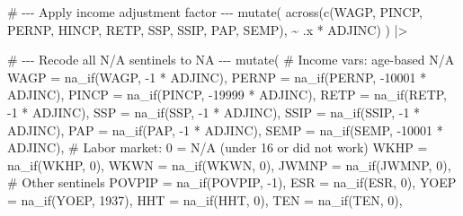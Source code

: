 \documentclass[
  letterpaper,
  DIV=11,
  numbers=noendperiod]{scrartcl}
\newenvironment{Shaded}{\begin{snugshade}}{\end{snugshade}}
\newcommand{\AttributeTok}[1]{\textcolor[rgb]{0.40,0.45,0.13}{#1}}
\newcommand{\CommentTok}[1]{\textcolor[rgb]{0.37,0.37,0.37}{#1}}
\newcommand{\DecValTok}[1]{\textcolor[rgb]{0.68,0.00,0.00}{#1}}
\newcommand{\FunctionTok}[1]{\textcolor[rgb]{0.28,0.35,0.67}{#1}}
\newcommand{\NormalTok}[1]{\textcolor[rgb]{0.00,0.23,0.31}{#1}}
\newcommand{\SpecialCharTok}[1]{\textcolor[rgb]{0.37,0.37,0.37}{#1}}
\begin{document}
\begin{Shaded}
\begin{Highlighting}[]
  \CommentTok{\# {-}{-}{-} Apply income adjustment factor {-}{-}{-}}
  \FunctionTok{mutate}\NormalTok{(}
    \FunctionTok{across}\NormalTok{(}\FunctionTok{c}\NormalTok{(WAGP, PINCP, PERNP, HINCP, RETP, SSP, SSIP, PAP, SEMP),}
           \SpecialCharTok{\textasciitilde{}}\NormalTok{ .x }\SpecialCharTok{*}\NormalTok{ ADJINC)}
\NormalTok{  ) }\SpecialCharTok{|\textgreater{}}

  \CommentTok{\# {-}{-}{-} Recode all N/A sentinels to NA {-}{-}{-}}
  \FunctionTok{mutate}\NormalTok{(}
    \CommentTok{\# Income vars: age{-}based N/A}
    \AttributeTok{WAGP   =} \FunctionTok{na\_if}\NormalTok{(WAGP,  }\SpecialCharTok{{-}}\DecValTok{1} \SpecialCharTok{*}\NormalTok{ ADJINC),}
    \AttributeTok{PERNP  =} \FunctionTok{na\_if}\NormalTok{(PERNP, }\SpecialCharTok{{-}}\DecValTok{10001} \SpecialCharTok{*}\NormalTok{ ADJINC),}
    \AttributeTok{PINCP  =} \FunctionTok{na\_if}\NormalTok{(PINCP, }\SpecialCharTok{{-}}\DecValTok{19999} \SpecialCharTok{*}\NormalTok{ ADJINC),}
    \AttributeTok{RETP   =} \FunctionTok{na\_if}\NormalTok{(RETP,  }\SpecialCharTok{{-}}\DecValTok{1} \SpecialCharTok{*}\NormalTok{ ADJINC),}
    \AttributeTok{SSP    =} \FunctionTok{na\_if}\NormalTok{(SSP,   }\SpecialCharTok{{-}}\DecValTok{1} \SpecialCharTok{*}\NormalTok{ ADJINC),}
    \AttributeTok{SSIP   =} \FunctionTok{na\_if}\NormalTok{(SSIP,  }\SpecialCharTok{{-}}\DecValTok{1} \SpecialCharTok{*}\NormalTok{ ADJINC),}
    \AttributeTok{PAP    =} \FunctionTok{na\_if}\NormalTok{(PAP,   }\SpecialCharTok{{-}}\DecValTok{1} \SpecialCharTok{*}\NormalTok{ ADJINC),}
    \AttributeTok{SEMP   =} \FunctionTok{na\_if}\NormalTok{(SEMP,  }\SpecialCharTok{{-}}\DecValTok{10001} \SpecialCharTok{*}\NormalTok{ ADJINC),}
    \CommentTok{\# Labor market: 0 = N/A (under 16 or did not work)}
    \AttributeTok{WKHP   =} \FunctionTok{na\_if}\NormalTok{(WKHP, }\DecValTok{0}\NormalTok{),}
    \AttributeTok{WKWN   =} \FunctionTok{na\_if}\NormalTok{(WKWN, }\DecValTok{0}\NormalTok{),}
    \AttributeTok{JWMNP  =} \FunctionTok{na\_if}\NormalTok{(JWMNP, }\DecValTok{0}\NormalTok{),}
    \CommentTok{\# Other sentinels}
    \AttributeTok{POVPIP =} \FunctionTok{na\_if}\NormalTok{(POVPIP, }\SpecialCharTok{{-}}\DecValTok{1}\NormalTok{),}
    \AttributeTok{ESR    =} \FunctionTok{na\_if}\NormalTok{(ESR, }\DecValTok{0}\NormalTok{),}
    \AttributeTok{YOEP   =} \FunctionTok{na\_if}\NormalTok{(YOEP, }\DecValTok{1937}\NormalTok{),}
    \AttributeTok{HHT    =} \FunctionTok{na\_if}\NormalTok{(HHT, }\DecValTok{0}\NormalTok{),}
    \AttributeTok{TEN    =} \FunctionTok{na\_if}\NormalTok{(TEN, }\DecValTok{0}\NormalTok{),}

\end{Highlighting}
\end{Shaded}
\end{document}
